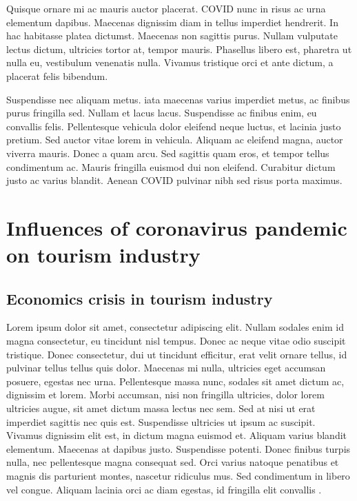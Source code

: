 \documentclass[draft=false
              ,paper=a4
              ,twoside=false
              ,fontsize=12pt
              ,headsepline
              ,BCOR10mm
              ,DIV11
              ]{article}
\begin{document}
Quisque ornare mi ac mauris auctor placerat. \gls{COVID} nunc in risus ac urna elementum dapibus. Maecenas dignissim diam in tellus imperdiet hendrerit. In hac habitasse platea dictumst. Maecenas non sagittis purus. Nullam vulputate lectus dictum, ultricies tortor at, tempor mauris. Phasellus libero est, pharetra ut nulla eu, vestibulum venenatis nulla. Vivamus tristique orci et ante dictum, a placerat felis bibendum.

Suspendisse nec aliquam metus. \gls{iata} maecenas varius imperdiet metus, ac finibus purus fringilla sed. Nullam et lacus lacus. Suspendisse ac finibus enim, eu convallis felis. Pellentesque vehicula dolor eleifend neque luctus, et lacinia justo pretium. Sed auctor vitae lorem in vehicula. Aliquam ac eleifend magna, auctor viverra mauris. Donec a quam arcu. Sed sagittis quam eros, et tempor tellus condimentum ac. Mauris fringilla euismod dui non eleifend. Curabitur dictum justo ac varius blandit. Aenean \gls{COVID} pulvinar nibh sed risus porta maximus.

\vspace{12pt}
\section{Influences of coronavirus pandemic on tourism industry}
\vspace{6pt}
\subsection{Economics crisis in tourism industry}
\vspace{6pt}

Lorem ipsum dolor sit amet, consectetur adipiscing elit. Nullam sodales enim id magna consectetur, eu tincidunt nisl tempus. Donec ac neque vitae odio suscipit tristique. Donec consectetur, dui ut tincidunt efficitur, erat velit ornare tellus, id pulvinar tellus tellus quis dolor. Maecenas mi nulla, ultricies eget accumsan posuere, egestas nec urna. Pellentesque massa nunc, sodales sit amet dictum ac, dignissim et lorem. Morbi accumsan, nisi non fringilla ultricies, dolor lorem ultricies augue, sit amet dictum massa lectus nec sem. Sed at nisi ut erat imperdiet sagittis nec quis est. Suspendisse ultricies ut ipsum ac suscipit. Vivamus dignissim elit est, in dictum magna euismod et. Aliquam varius blandit elementum. Maecenas at dapibus justo. Suspendisse potenti. Donec finibus turpis nulla, nec pellentesque magna consequat sed. Orci varius natoque penatibus et magnis dis parturient montes, nascetur ridiculus mus. Sed condimentum in libero vel congue. Aliquam lacinia orci ac diam egestas, id fringilla elit convallis \cite{lorem}.
\end{document}
